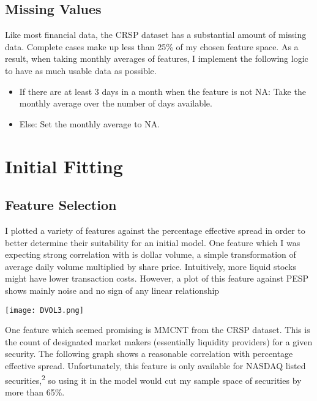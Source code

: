 \documentclass{article}
\begin{document}
\begin{multicols}{2}
\subsection{Missing Values}
Like most financial data, the CRSP dataset has a substantial amount of missing data. Complete cases make up less than 25\% of my chosen feature space. As a result, when taking monthly averages of features, I implement the following logic to have as much usable data as possible.



\begin{itemize}
  \item If there are at least 3 days in a month when the feature is not NA: Take the monthly average over the number of days available.
\item Else: Set the monthly average to NA.
\end{itemize}


\section{Initial Fitting}

\subsection{Feature Selection}
\par
I plotted a variety of features against the percentage effective spread in order to better determine their suitability for an initial model. One feature which I was expecting strong correlation with is dollar volume, a simple transformation of average daily volume multiplied by share price. Intuitively, more liquid stocks might have lower transaction costs. However, a plot of this feature against PESP shows mainly noise and no sign of any linear relationship \par

\begingroup
    \centering
    \texttt{[image: DVOL3.png]}
\endgroup
\vspace{3mm}
\par

\par
One feature which seemed promising is MMCNT from the CRSP dataset. This is the count of designated market makers (essentially liquidity providers) for a given security. The following graph shows a reasonable correlation with percentage effective spread. Unfortunately, this feature is only available for NASDAQ listed securities,\textsuperscript{2} so using it in the model would cut my sample space of securities by more than 65\%.


\end{multicols}
\end{document}
